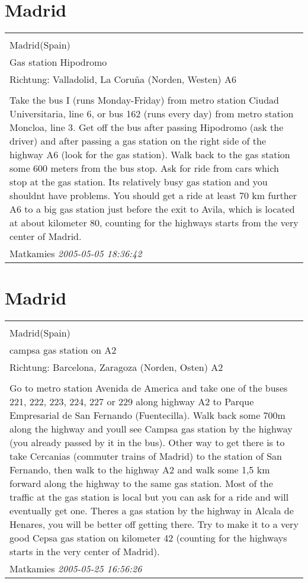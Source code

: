 \documentclass[a4paper,12pt]{article}
\begin{document}
\section{Madrid}
\begin{tabular}{|p{13cm}|}
\hline\\
Madrid(Spain)\\
Gas station Hipodromo\\
Richtung: Valladolid, La Coruña (Norden, Westen) A6 \\
\hline\\
Take the bus I (runs Monday-Friday) from metro station Ciudad Universitaria, line 6, or bus 162 (runs every day) from metro station Moncloa, line 3. Get off the bus after passing Hipodromo (ask the driver) and after passing a gas station on the right side of the highway A6 (look for the gas station). Walk back to the gas station some 600 meters from the bus stop. Ask for ride from cars which stop at the gas station. Its relatively busy gas station and you shouldnt have problems. You should get a ride at least 70 km further A6 to a big gas station just before the exit to Avila, which is located at about kilometer 80, counting for the highways starts from the very center of Madrid. \\
Matkamies \textit{ 2005-05-05 18:36:42 }\\\hline
\end{tabular}


\section{Madrid}
\begin{tabular}{|p{13cm}|}
\hline\\
Madrid(Spain)\\
campsa gas station on A2\\
Richtung: Barcelona, Zaragoza (Norden, Osten) A2 \\
\hline\\
Go to metro station Avenida de America and take one of the buses 221, 222, 223, 224, 227 or 229 along highway A2 to Parque Empresarial de San Fernando (Fuentecilla). Walk back some 700m along the highway and youll see Campsa gas station by the highway (you already passed by it in the bus). Other way to get there is to take Cercanias (commuter trains of Madrid) to the station of San Fernando, then walk to the highway A2 and walk some 1,5 km forward along the highway to the same gas station. Most of the traffic at the gas station is local but you can ask for a ride and will eventually get one. Theres a gas station by the highway in Alcala de Henares, you will be better off getting there. Try to make it to a very good Cepsa gas station on kilometer 42 (counting for the highways starts in the very center of Madrid). \\
Matkamies \textit{ 2005-05-25 16:56:26 }\\\hline
\end{tabular}
\end{document}
